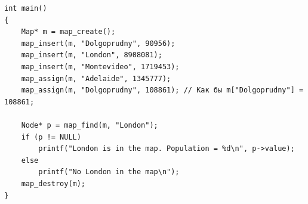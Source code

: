 \documentclass{article}
\begin{document}
\begin{itemize}
\begin{lstlisting}
int main()
{
	Map* m = map_create();
	map_insert(m, "Dolgoprudny", 90956);
	map_insert(m, "London", 8908081);
	map_insert(m, "Montevideo", 1719453);
	map_assign(m, "Adelaide", 1345777);
	map_assign(m, "Dolgoprudny", 108861); // Как бы m["Dolgoprudny"] = 108861;

	Node* p = map_find(m, "London");
	if (p != NULL)
		printf("London is in the map. Population = %d\n", p->value);
	else
		printf("No London in the map\n");
	map_destroy(m);
}
\end{lstlisting}
\end{itemize}
\end{document}
